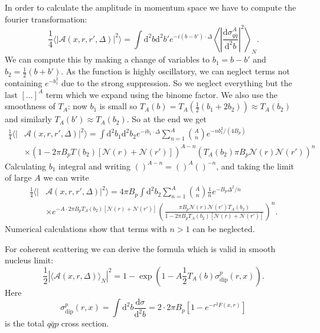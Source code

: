 \documentclass[a4paper,12pt]{article}
\newcommand{\der}{\mathrm{d}}
\newcommand{\A}{\mathcal{A}}
\newcommand{\N}{\mathcal{N}}
\begin{document}
In order to calculate the amplitude in momentum space we have to compute the fourier transformation:
\begin{equation}
	\frac{1}{4} \langle |\A(x,r,r',\Delta)|^2 \rangle = \int \der^2 b \der^2 b' e^{-i(b-b')\cdot \Delta} \left \langle \left| \frac{\der \sigma_{q\bar q}^A}{\der^2 b} \right|^2 \right \rangle_N.
\end{equation}
We can compute this by making a change of variables to $b_1 = b-b'$ and $b_2 = \frac{1}{2}(b+b')$. As the function is highly oscillatory, we can neglect terms not containing $e^{-b_1^2}$ due to the strong suppression. So we neglect everything but the last $[\dots ]^A$ term which we expand using the binome factor. We also use the smoothness of $T_A$: now $b_1$ is small so $T_A(b)=T_A(\frac{1}{2}(b_1+2b_2)) \approx T_A(b_2)$ and similarly $T_A(b')\approx T_A(b_2)$. So at the end we get
\begin{equation}
\begin{split}
	\frac{1}{4} \langle |&\A(x,r,r',\Delta)|^2 \rangle = \int \der^2 b_1 \der^2 b_2 e^{-ib_1 \cdot \Delta} \sum_{n=1}^A \binom{A}{n} e^{-nb_1^2/(4B_p)}  \\
	& \times \left(1-2\pi B_p T(b_2)[\N(r)+\N(r')] \right)^{A-n} \left( T_A(b_2)\pi B_p \N(r)\N(r') \right)^n 
\end{split}
\end{equation}
Calculating $b_1$ integral and writing $()^{A-n} = ()^A ()^{-n}$, and taking the limit of large $A$ we can write
\begin{equation}
\begin{split}
	\frac{1}{4} \langle |&\A(x,r,r',\Delta)|^2 \rangle = 4\pi B_p \int \der^2 b_2  \sum_{n=1}^A \binom{A}{n} \frac{1}{n} e^{-B_p\Delta^2/n}  \\
	&\times e^{-A\cdot 2\pi B_p T_A(b_2)[\N(r)+\N(r')]} \left( \frac{\pi B_p \N(r)\N(r')T_A(b_2)}{1-2\pi B_p T_A(b_2) [ \N(r)+\N(r')]} \right)^n.
\end{split}
\end{equation}
Numerical calculations show that terms with $n>1$ can be neglected.

For coherent scattering we can derive \cite{PhysRevD.68.114005} the formula which is valid in smooth nucleus limit:
\begin{equation}
	\frac{1}{2}|\langle \A(x,r,\Delta)\rangle_N|^2 = 1 - \exp\left( 1 - A\frac{1}{2}T_A(b)\sigma_\text{dip}^p(r,x) \right).
\end{equation}
Here
\begin{equation}
	\sigma_\text{dip}^p(r,x) = \int \der^2 b \frac{\der \sigma}{\der^2 b} = 2\cdot 2\pi B_p[1-e^{-r^2F(x,r)}]
\end{equation}
is the total $q\bar qp$ cross section.
\end{document}
